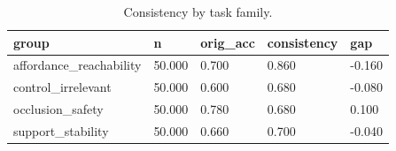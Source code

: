 \begin{table}[t]
\centering
\begin{tabular}{lllll}
\toprule
group & n & orig_acc & consistency & gap \\
\midrule
affordance_reachability & 50.000 & 0.700 & 0.860 & -0.160 \\
control_irrelevant & 50.000 & 0.600 & 0.680 & -0.080 \\
occlusion_safety & 50.000 & 0.780 & 0.680 & 0.100 \\
support_stability & 50.000 & 0.660 & 0.700 & -0.040 \\
\bottomrule
\end{tabular}
\caption{Consistency by task family.}
\end{table}
